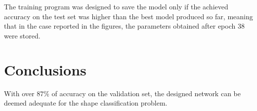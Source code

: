\documentclass[12pt]{article}
\begin{document}
The training program was designed to save the model only if the achieved accuracy on the test set was higher than the best model produced so far, meaning that in the case reported in the figures, the parameters obtained after epoch 38 were stored.

\section{Conclusions}

With over $87\%$ of accuracy on the validation set, the designed network can be deemed adequate for the shape classification problem.\\
\end{document}
